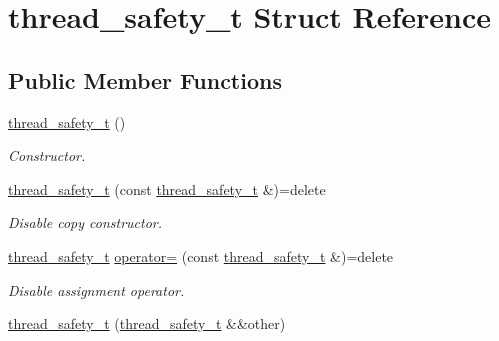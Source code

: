 \hypertarget{structthread__safety__t}{}\section{thread\+\_\+safety\+\_\+t Struct Reference}
\label{structthread__safety__t}
\subsection*{Public Member Functions}
\begin{DoxyCompactItemize}
\item 
\mbox{\label{structthread__safety__t_affe6e40500b283b09da658ec7155569b}} 
\mbox{\hyperlink{structthread__safety__t_affe6e40500b283b09da658ec7155569b}{thread\+\_\+safety\+\_\+t}} ()
\begin{DoxyCompactList}\small\item\em Constructor. \end{DoxyCompactList}\item 
\mbox{\label{structthread__safety__t_a30ce2b5978bc536597d70b39b7599079}} 
\mbox{\hyperlink{structthread__safety__t_a30ce2b5978bc536597d70b39b7599079}{thread\+\_\+safety\+\_\+t}} (const \mbox{\hyperlink{structthread__safety__t}{thread\+\_\+safety\+\_\+t}} \&)=delete
\begin{DoxyCompactList}\small\item\em Disable copy constructor. \end{DoxyCompactList}\item 
\mbox{\label{structthread__safety__t_aa5d76d10d30be6006b6a041864ee8226}} 
\mbox{\hyperlink{structthread__safety__t}{thread\+\_\+safety\+\_\+t}} \mbox{\hyperlink{structthread__safety__t_aa5d76d10d30be6006b6a041864ee8226}{operator=}} (const \mbox{\hyperlink{structthread__safety__t}{thread\+\_\+safety\+\_\+t}} \&)=delete
\begin{DoxyCompactList}\small\item\em Disable assignment operator. \end{DoxyCompactList}\item 
\mbox{\label{structthread__safety__t_ad717eec7938355aec034f1276a099cde}} 
\mbox{\hyperlink{structthread__safety__t_ad717eec7938355aec034f1276a099cde}{thread\+\_\+safety\+\_\+t}} (\mbox{\hyperlink{structthread__safety__t}{thread\+\_\+safety\+\_\+t}} \&\&other)

\end{DoxyCompactItemize}

